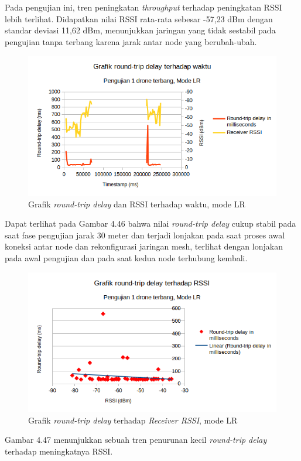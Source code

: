 Pada pengujian ini, tren peningkatan \textit{throughput} terhadap peningkatan RSSI lebih terlihat. Didapatkan nilai RSSI rata-rata sebesar -57,23 dBm dengan standar deviasi 11,62 dBm, menunjukkan jaringan yang tidak sestabil pada pengujian tanpa terbang karena jarak antar node yang berubah-ubah.
\begin{figure}[H]
	\centering
	\includegraphics[scale=0.7]{./assets/Graphs/1Fly_LR/Delay-Time}
	\caption{Grafik \textit{round-trip delay} dan RSSI terhadap waktu, mode LR}
\end{figure}
Dapat terlihat pada Gambar 4.46 bahwa nilai \textit{round-trip delay} cukup stabil pada saat fase pengujian jarak 30 meter dan terjadi lonjakan pada saat proses awal koneksi antar node dan rekonfigurasi jaringan mesh, terlihat dengan lonjakan pada awal pengujian dan pada saat kedua node terhubung kembali.
\begin{figure}[H]
	\centering
	\includegraphics[scale=0.7]{./assets/Graphs/1Fly_LR/Delay-RSSI}
	\caption{Grafik \textit{round-trip delay} terhadap \textit{Receiver RSSI}, mode LR}
\end{figure}
Gambar 4.47 menunjukkan sebuah tren penurunan kecil \textit{round-trip delay} terhadap meningkatnya RSSI.

